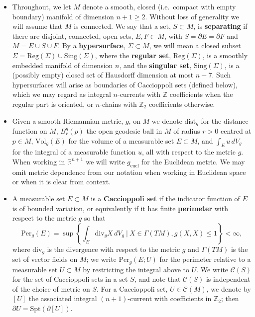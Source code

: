 \documentclass[12pt]{article}
\begin{document}
\begin{itemize}
    \item Throughout, we let $M$ denote a smooth, closed (i.e.~compact with empty boundary) manifold of dimension $n + 1 \geq 2$. Without loss of generality we will assume that $M$ is connected. We say that a set, $S \subset M$, is \textbf{separating} if there are disjoint, connected, open sets, $E,F \subset M$, with $S = \partial E = \partial F$ and $M = E \cup S \cup F$. By a \textbf{hypersurface}, $\Sigma \subset M$, we will mean a closed subset $\Sigma = \mathrm{Reg}(\Sigma) \cup \mathrm{Sing}(\Sigma)$, where the \textbf{regular set}, $\mathrm{Reg}(\Sigma)$, is a smoothly embedded manifold of dimension $n$, and the \textbf{singular set}, $\mathrm{Sing}(\Sigma)$, is a (possibly empty) closed set of Hausdorff dimension at most $n-7$. Such hypersurfaces will arise as boundaries of Caccioppoli sets (defined below), which we may regard as integral $n$-currents with $\mathbb{Z}$ coefficients when the regular part is oriented, or $n$-chains with $\mathbb{Z}_2$ coefficients otherwise.

    \item Given a smooth Riemannian metric, $g$, on $M$ we denote $\mathrm{dist}_g$ for the distance function on $M$, $B^g_r(p)$ the open geodesic ball in $M$ of radius $r > 0$ centred at $p \in M$, $\mathrm{Vol}_g(E)$ for the volume of a measurable set $E \subset M$, and $\int_E u \, dV_g$ for the integral of a measurable function $u$, all with respect to the metric $g$. When working in $\mathbb{R}^{n+1}$ we will write $g_\mathrm{eucl}$ for the Euclidean metric. We may omit metric dependence from our notation when working in Euclidean space or when it is clear from context.

    \item A measurable set $E \subset M$ is a \textbf{Caccioppoli set} if the indicator function of $E$ is of bounded variation, or equivalently if it has finite \textbf{perimeter} with respect to the metric $g$ so that
    \begin{equation*}
    \mathrm{Per}_g(E) = \sup \left\{\int_E \mathrm{div}_g X \, dV_g \: \bigg| \: X \in \Gamma(TM), g(X,X) \leq 1 \right\} < \infty,
    \end{equation*}
    where $\mathrm{div}_g$ is the divergence with respect to the metric $g$ and $\Gamma(TM)$ is the set of vector fields on $M$; we write $\mathrm{Per}_g(E;U)$ for the perimeter relative to a measurable set $U \subset M$ by restricting the integral above to $U$. We write $\mathcal{C}(S)$ for the set of Caccioppoli sets in a set $S$, and note that $\mathcal{C}(S)$ is independent of the choice of metric on $S$. For a Caccioppoli set, $U \in \mathcal{C}(M)$, we denote by $[U]$ the associated integral $(n+1)$-current with coefficients in $\mathbb Z_2$; then $\partial U =\mathrm{Spt}(\partial[U])$.
    

\end{itemize}
\end{document}
